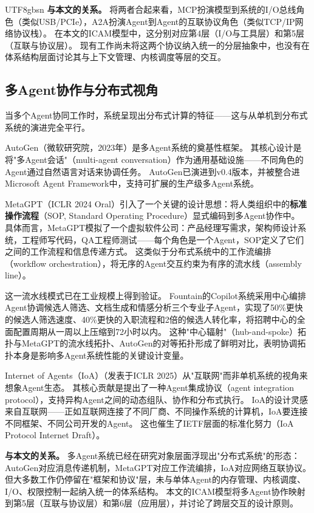 \documentclass[11pt,a4paper]{article}
\begin{document}
\begin{CJK*}{UTF8}{gbsn}
\textbf{与本文的关系。}
将两者合起来看，MCP扮演模型到系统的I/O总线角色（类似USB/PCIe），A2A扮演Agent到Agent的互联协议角色（类似TCP/IP网络协议栈）。
在本文的ICAM模型中，这分别对应第4层（I/O与工具层）和第5层（互联与协议层）。
现有工作尚未将这两个协议纳入统一的分层抽象中，也没有在体系结构层面讨论其与上下文管理、内核调度等层的交互。

\subsection{多Agent协作与分布式视角}
\label{sec:related-multiagent}

当多个Agent协同工作时，系统呈现出分布式计算的特征——这与从单机到分布式系统的演进完全平行。

AutoGen\cite{wu2023autogen}（微软研究院，2023年）是多Agent系统的奠基性框架。
其核心设计是将"多Agent会话"（multi-agent conversation）作为通用基础设施——不同角色的Agent通过自然语言对话来协调任务。
AutoGen已演进到v0.4版本，并被整合进Microsoft Agent Framework中，支持可扩展的生产级多Agent系统。

MetaGPT\cite{metagpt2023}（ICLR 2024 Oral）引入了一个关键的设计思想：将人类组织中的\textbf{标准操作流程}（SOP, Standard Operating Procedure）显式编码到多Agent协作中。
具体而言，MetaGPT模拟了一个虚拟软件公司：产品经理写需求，架构师设计系统，工程师写代码，QA工程师测试——每个角色是一个Agent，SOP定义了它们之间的工作流程和信息传递方式。
这类似于分布式系统中的工作流编排（workflow orchestration），将无序的Agent交互约束为有序的流水线（assembly line）。

这一流水线模式已在工业规模上得到验证。
Fountain的Copilot系统采用中心编排Agent协调候选人筛选、文档生成和情感分析三个专业子Agent，实现了50\%更快的候选人筛选速度、40\%更快的入职流程和2倍的候选人转化率，将招聘中心的全面配置周期从一周以上压缩到72小时以内\cite{anthropic2026agenticreport}。
这种"中心辐射"（hub-and-spoke）拓扑与MetaGPT的流水线拓扑、AutoGen的对等拓扑形成了鲜明对比，表明协调拓扑本身是影响多Agent系统性能的关键设计变量\cite{wu2023autogen,metagpt2023}。

Internet of Agents（IoA）\cite{ioa2024}（发表于ICLR 2025）从"互联网"而非单机系统的视角来想象Agent生态。
其核心贡献是提出了一种Agent集成协议（agent integration protocol），支持异构Agent之间的动态组队、协作和分布式执行。
IoA的设计灵感来自互联网——正如互联网连接了不同厂商、不同操作系统的计算机，IoA要连接不同框架、不同公司开发的Agent。
这也催生了IETF层面的标准化努力（IoA Protocol Internet Draft）。

\textbf{与本文的关系。}
多Agent系统已经在研究对象层面浮现出"分布式系统"的形态：AutoGen对应消息传递机制，MetaGPT对应工作流编排，IoA对应网络互联协议。
但大多数工作仍停留在"框架和协议"层，未与单体Agent的内存管理、内核调度、I/O、权限控制一起纳入统一的体系结构。
本文的ICAM模型将多Agent协作映射到第5层（互联与协议层）和第6层（应用层），并讨论了跨层交互的设计原则。


\end{CJK*}
\end{document}
